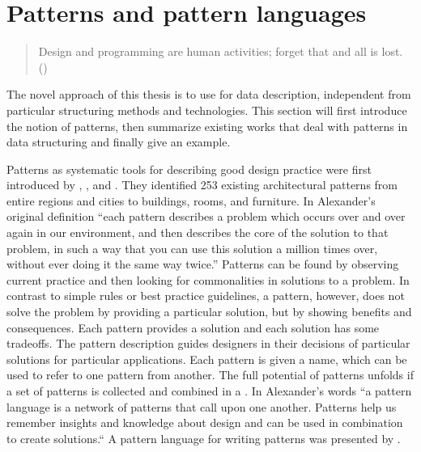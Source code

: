 \section{Patterns and pattern languages}
\label{sec:patterntheory}

\begin{quotation}%
Design and programming are human activities; forget that and all is lost.
\\\quotationsource {} (\citeyear{Stroustrup1997})
\end{quotation}

\noindent The novel approach of this thesis is to use 
for data description, independent from particular structuring methods and
technologies. This section will first introduce the notion of patterns, then
summarize existing works that deal with patterns in data structuring and
finally give an example.

Patterns as systematic tools for describing good design practice were first
introduced by , , and
 \citeyear{Alexander1977}. They identified 253
existing architectural patterns from entire regions and cities to buildings,
rooms, and furniture. In Alexander's original definition \citeyear[p.
x]{Alexander1977} ``each pattern describes a problem which occurs over and over
again in our environment, and then describes the core of the solution to that
problem, in such a way that you can use this solution a million times over,
without ever doing it the same way twice.'' Patterns can be found by observing
current practice and then looking for commonalities in solutions to a problem.
In contrast to simple rules or best practice guidelines, a pattern, however,
does not solve the problem by providing a particular solution, but by showing
benefits and consequences. Each pattern provides a solution and each solution
has some tradeoffs. The pattern description guides designers in their decisions
of particular solutions for particular applications. Each pattern is given a
name, which can be used to refer to one pattern from another. The full
potential of patterns unfolds if a set of patterns is collected and combined in
a . In Alexander's words ``a pattern language is a
network of patterns that call upon one another. Patterns help us remember
insights and knowledge about design and can be used in combination to create
solutions.`` A pattern language for writing patterns was presented by
\textcite{Meszaros1997}.


